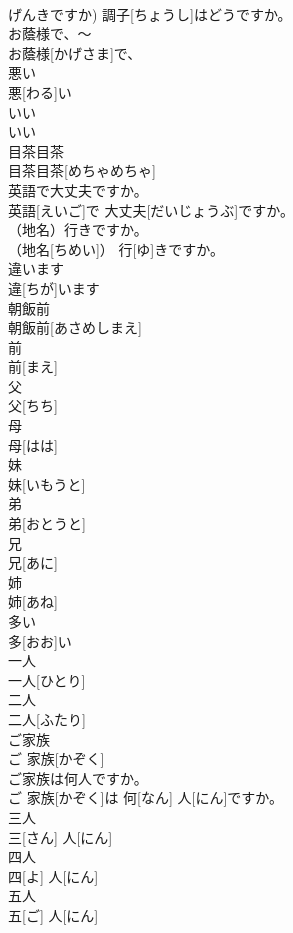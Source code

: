 \documentclass[8pt]{extreport}
\begin{document}
\begin{CJK}{UTF8}{min}
\\	げんきですか)	調子[ちょうし]はどうですか。
\\	お蔭様で、～	
\\	お蔭様[かげさま]で、~
\\	悪い	
\\	悪[わる]い
\\	いい	
\\	いい
\\	目茶目茶	
\\	目茶目茶[めちゃめちゃ]
\\	英語で大丈夫ですか。	
\\	英語[えいご]で 大丈夫[だいじょうぶ]ですか。
\\	（地名）行きですか。	
\\	（地名[ちめい]） 行[ゆ]きですか。
\\	違います	
\\	違[ちが]います
\\	朝飯前	
\\	朝飯前[あさめしまえ]
\\	前	
\\	前[まえ]
\\	父	
\\	父[ちち]
\\	母	
\\	母[はは]
\\	妹	
\\	妹[いもうと]
\\	弟	
\\	弟[おとうと]
\\	兄	
\\	兄[あに]
\\	姉	
\\	姉[あね]
\\	多い	
\\	多[おお]い
\\	一人	
\\	一人[ひとり]
\\	二人	
\\	二人[ふたり]
\\	ご家族	
\\	ご 家族[かぞく]
\\	ご家族は何人ですか。	
\\	ご 家族[かぞく]は 何[なん] 人[にん]ですか。
\\	三人	
\\	三[さん] 人[にん]
\\	四人	
\\	四[よ] 人[にん]
\\	五人	
\\	五[ご] 人[にん]

\end{CJK}
\end{document}
